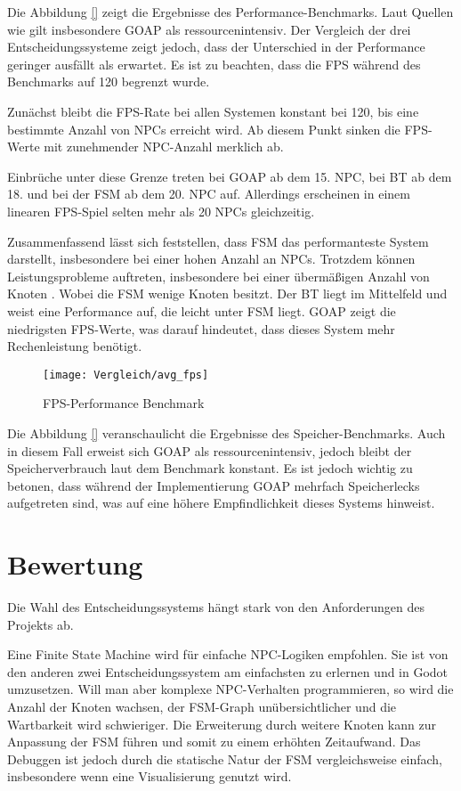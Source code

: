 Die Abbildung \ref{} zeigt die Ergebnisse des Performance-Benchmarks. Laut Quellen wie \autocite{} gilt insbesondere GOAP als ressourcenintensiv. Der Vergleich der drei Entscheidungssysteme zeigt jedoch, dass der Unterschied in der Performance geringer ausf\"{a}llt als erwartet. Es ist zu beachten, dass die FPS w\"{a}hrend des Benchmarks auf 120 begrenzt wurde. 

Zun\"{a}chst bleibt die FPS-Rate bei allen Systemen konstant bei 120, bis eine bestimmte Anzahl von NPCs erreicht wird. Ab diesem Punkt sinken die FPS-Werte mit zunehmender NPC-Anzahl merklich ab.

Einbr\"{u}che unter diese Grenze treten bei GOAP ab dem 15. NPC, bei BT ab dem 18. und bei der FSM ab dem 20. NPC auf. Allerdings erscheinen in einem linearen FPS-Spiel selten mehr als 20 NPCs gleichzeitig. 

Zusammenfassend l\"{a}sst sich feststellen, dass FSM das performanteste System darstellt, insbesondere bei einer hohen Anzahl an NPCs. Trotzdem k\"{o}nnen Leistungsprobleme auftreten, insbesondere bei einer \"{u}berm\"{a}\ss{}igen Anzahl von Knoten \autocite{U2023}. Wobei die FSM wenige Knoten besitzt. Der BT liegt im Mittelfeld und weist eine Performance auf, die leicht unter FSM liegt. GOAP zeigt die niedrigsten FPS-Werte, was darauf hindeutet, dass dieses System mehr Rechenleistung ben\"{o}tigt.

\begin{figure}[h]
  \centering
  \texttt{[image: Vergleich/avg\_fps]}
	\captionsetup{justification=justified, format=plain}
  \caption{FPS-Performance Benchmark}
  \label{FPS-Performance Benchmark}
\end{figure}

Die Abbildung \ref{} veranschaulicht die Ergebnisse des Speicher-Benchmarks. Auch in diesem Fall erweist sich GOAP als ressourcenintensiv, jedoch bleibt der Speicherverbrauch laut dem Benchmark konstant. Es ist jedoch wichtig zu betonen, dass w\"{a}hrend der Implementierung GOAP mehrfach Speicherlecks aufgetreten sind, was auf eine h\"{o}here Empfindlichkeit dieses Systems hinweist.


\section{Bewertung}
\label{chap:bewertung}

Die Wahl des Entscheidungssystems h\"{a}ngt stark von den Anforderungen des Projekts ab.

Eine Finite State Machine wird f\"{u}r einfache NPC-Logiken empfohlen. Sie ist von den anderen zwei Entscheidungssystem am einfachsten zu erlernen und in Godot umzusetzen. Will man aber komplexe NPC-Verhalten programmieren, so wird die Anzahl der Knoten wachsen, der FSM-Graph un\"{u}bersichtlicher und die Wartbarkeit wird schwieriger. Die Erweiterung durch weitere Knoten kann zur Anpassung der FSM f\"{u}hren und somit zu einem erh\"{o}hten Zeitaufwand. Das Debuggen ist jedoch durch die statische Natur der FSM vergleichsweise einfach, insbesondere wenn eine Visualisierung genutzt wird.

